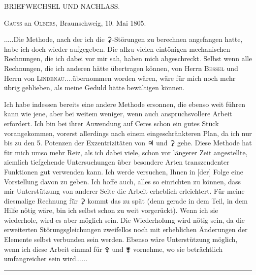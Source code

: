 \clearpage
{}
\begin{center}
{\large BRIEFWECHSEL UND NACHLASS.\par}
\par
[MAI—JULI 1805.]\par
\bigskip
[1.]\par
\medskip
\textsc{Gauss} an \textsc{Olbers}, Braunschweig, 10. Mai 1805.
\end{center}
\noindent\hspace*{\parindent}.\quad.\quad.\quad.\quad.\quad Die Methode, nach der ich die {\AstroSymbols ⚳}-Störungen zu berechnen angefangen hatte, habe ich doch wieder aufgegeben. Die allzu vielen eintönigen mechanischen Rechnungen, die ich dabei vor mir sah, haben mich abgeschreckt. Selbst wenn alle Rechnungen, die ich anderen hätte übertragen können, von Herrn \textsc{Bessel} und Herrn von \textsc{Lindenau}\quad.\quad.\quad.\quad.\quad übernommen worden wären, wäre für mich noch mehr übrig geblieben, als meine Geduld hätte bewältigen können.

Ich habe indessen bereits eine andere Methode ersonnen, die ebenso weit führen kann wie jene, aber bei weitem weniger, wenn auch anspruchsvollere Arbeit erfordert. Ich bin bei ihrer Anwendung auf Ceres schon ein gutes Stück vorangekommen, vorerst allerdings nach einem eingeschränkteren Plan, da ich nur bis zu den 5. Potenzen der Exzentrizitäten von {\AstroSymbols ♃} und {\AstroSymbols ⚳} gehe. Diese Methode hat für mich umso mehr Reiz, als ich dabei viele, schon vor längerer Zeit angestellte, ziemlich tiefgehende Untersuchungen über besondere Arten transzendenter Funktionen gut verwenden kann. Ich werde versuchen, Ihnen in [der] Folge eine Vorstellung davon zu geben. Ich hoffe auch, alles so einrichten zu können, dass mir Unterstützung von anderer Seite die Arbeit erheblich erleichtert. Für meine diesmalige Rechnung für {\AstroSymbols ⚳} kommt das zu spät (denn gerade in dem Teil, in dem Hilfe nötig wäre, bin ich selbst schon zu weit vorgerückt). Wenn ich sie wiederhole, wird es aber möglich sein. Die Wiederholung wird nötig sein, da die erweiterten Störungsgleichungen zweifellos noch mit erheblichen Änderungen der Elemente selbst verbunden sein werden. Ebenso wäre Unterstützung möglich, wenn ich diese Arbeit einmal für {\AstroSymbols ⚴} und {\AstroSymbols ⚵} vornehme, wo sie beträchtlich umfangreicher sein wird.\quad.\quad.\quad.\quad.\quad.
\par\medskip
\begin{center}\rule{.30\linewidth}{.4pt}\end{center}
